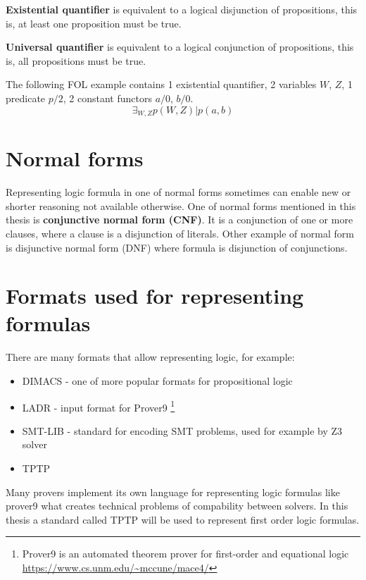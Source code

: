 \textbf{Existential quantifier}
is equivalent to a logical disjunction of propositions, this is, at least one proposition must be true.

\textbf{Universal quantifier}
is equivalent to a logical conjunction of propositions, this is, all propositions must be true.

The following \gls{FOL} example contains 1 existential quantifier, 2 variables $W$, $Z$, 1 predicate $p/2$, 2 constant functors $a/0$, $b/0$.
\begin{equation} \label{eg:FOL_1}
  \exists_{W,Z} p(W,Z) | p(a, b)
\end{equation}

\section{Normal forms}

Representing logic formula in one of normal forms sometimes can enable new or shorter reasoning not available otherwise. One of normal forms mentioned in this thesis is \textbf{conjunctive normal form (CNF)}. It is a conjunction of one or more clauses, where a clause is a disjunction of literals. Other example of normal form is disjunctive normal form (DNF) where formula is disjunction of conjunctions.

\section{Formats used for representing formulas}

There are many formats that allow representing logic, for example:

\begin{itemize}
  \item DIMACS - one of more popular formats for propositional logic 
  \item \gls{LADR} - input format for Prover9 \footnote{Prover9 is an automated theorem prover for first-order and equational logic \url{https://www.cs.unm.edu/~mccune/mace4/}}
  \item SMT-LIB - standard for encoding SMT problems, used for example by Z3 solver
  \item \gls{TPTP} 
\end{itemize}

Many provers implement its own language for representing logic formulas like prover9 what creates technical problems of compability between solvers. In this thesis a standard called \gls{TPTP} will be used to represent first order logic formulas.

